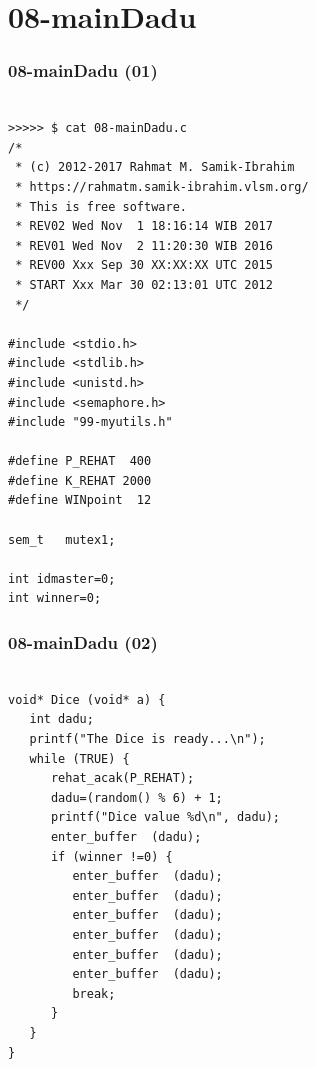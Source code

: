 \documentclass[xcolor=table, notheorems, hyperref={pdfpagelabels=false}]{beamer}
\begin{document}
\section{08-mainDadu}
\begin{frame}[fragile]
\frametitle{08-mainDadu (01)}
\begin{lstlisting}[basicstyle=\ttfamily\tiny]

>>>>> $ cat 08-mainDadu.c
/*
 * (c) 2012-2017 Rahmat M. Samik-Ibrahim
 * https://rahmatm.samik-ibrahim.vlsm.org/
 * This is free software.
 * REV02 Wed Nov  1 18:16:14 WIB 2017
 * REV01 Wed Nov  2 11:20:30 WIB 2016
 * REV00 Xxx Sep 30 XX:XX:XX UTC 2015
 * START Xxx Mar 30 02:13:01 UTC 2012
 */

#include <stdio.h>
#include <stdlib.h>
#include <unistd.h>
#include <semaphore.h>
#include "99-myutils.h"

#define P_REHAT  400
#define K_REHAT 2000
#define WINpoint  12

sem_t	mutex1;
	
int	idmaster=0;
int	winner=0;

\end{lstlisting}
\end{frame}

\begin{frame}[fragile]
\frametitle{08-mainDadu (02)}
\begin{lstlisting}[basicstyle=\ttfamily\tiny]

void* Dice (void* a) {
   int dadu;
   printf("The Dice is ready...\n");
   while (TRUE) {
      rehat_acak(P_REHAT);
      dadu=(random() % 6) + 1;
      printf("Dice value %d\n", dadu);
      enter_buffer  (dadu);
      if (winner !=0) {
         enter_buffer  (dadu);
         enter_buffer  (dadu);
         enter_buffer  (dadu);
         enter_buffer  (dadu);
         enter_buffer  (dadu);
         enter_buffer  (dadu);
         break;
      }
   }
}

\end{lstlisting}
\end{frame}
\end{document}
